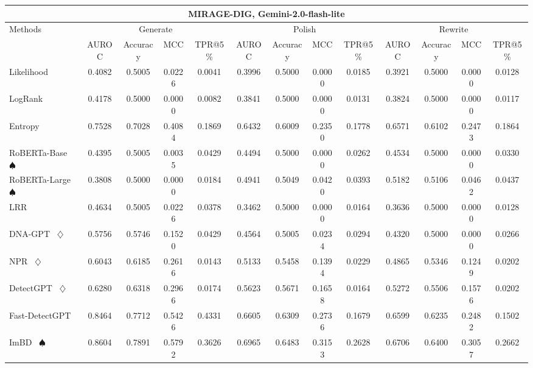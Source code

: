 \begin{table*}[h]
{\begin{tabular}{l|cccc|cccc|cccc}
    \hline

    \hline
    \multicolumn{13}{c}{\textbf{MIRAGE-DIG, Gemini-2.0-flash-lite}}\\
    \hline

    \hline

    \hline
    \multirow{2}{*}{Methods}&\multicolumn{4}{c|}{Generate}&\multicolumn{4}{c|}{Polish}&\multicolumn{4}{c}{Rewrite} \\
    &  AUROC  &  Accuracy  &  MCC  &  TPR@5\%  &  AUROC  &  Accuracy  &  MCC  &  TPR@5\%  &  AUROC  &  Accuracy  &  MCC  &  TPR@5\%  \\
    \hline

    \hline
    Likelihood~\cite{likelihood} & 0.4082 & 0.5005 & 0.0226 & 0.0041 & 0.3996 & 0.5000 & 0.0000 & 0.0185 & 0.3921 & 0.5000 & 0.0000 & 0.0128 \\
    LogRank~\cite{logrank} & 0.4178 & 0.5000 & 0.0000 & 0.0082 & 0.3841 & 0.5000 & 0.0000 & 0.0131 & 0.3824 & 0.5000 & 0.0000 & 0.0117 \\
    Entropy~\cite{entropy} & 0.7528 & 0.7028 & 0.4084 & 0.1869 & 0.6432 & 0.6009 & 0.2350 & 0.1778 & 0.6571 & 0.6102 & 0.2473 & 0.1864 \\
    RoBERTa-Base~\cite{roberta} $\spadesuit$ & 0.4395 & 0.5005 & 0.0035 & 0.0429 & 0.4494 & 0.5000 & 0.0000 & 0.0262 & 0.4534 & 0.5000 & 0.0000 & 0.0330 \\
    RoBERTa-Large~\cite{roberta} $\spadesuit$ & 0.3808 & 0.5000 & 0.0000 & 0.0184 & 0.4941 & 0.5049 & 0.0420 & 0.0393 & 0.5182 & 0.5106 & 0.0462 & 0.0437 \\
    LRR~\cite{lrrandnpr} & 0.4634 & 0.5005 & 0.0226 & 0.0378 & 0.3462 & 0.5000 & 0.0000 & 0.0164 & 0.3636 & 0.5000 & 0.0000 & 0.0128 \\
    DNA-GPT~\cite{dna-gpt} $\diamondsuit$ & 0.5756 & 0.5746 & 0.1520 & 0.0429 & 0.4564 & 0.5005 & 0.0234 & 0.0294 & 0.4320 & 0.5000 & 0.0000 & 0.0266 \\
    NPR~\cite{lrrandnpr} $\diamondsuit$ & 0.6043 & 0.6185 & 0.2616 & 0.0143 & 0.5133 & 0.5458 & 0.1394 & 0.0229 & 0.4865 & 0.5346 & 0.1249 & 0.0202 \\
    DetectGPT~\cite{detectgpt} $\diamondsuit$ & 0.6280 & 0.6318 & 0.2966 & 0.0174 & 0.5623 & 0.5671 & 0.1658 & 0.0164 & 0.5272 & 0.5506 & 0.1576 & 0.0202 \\
    Fast-DetectGPT~\cite{fastdetectgpt} & 0.8464 & 0.7712 & 0.5426 & 0.4331 & 0.6605 & 0.6309 & 0.2736 & 0.1679 & 0.6599 & 0.6235 & 0.2482 & 0.1502 \\
    ImBD~\cite{imbd} $\spadesuit$ & 0.8604 & 0.7891 & 0.5792 & 0.3626 & 0.6965 & 0.6483 & 0.3153 & 0.2628 & 0.6706 & 0.6400 & 0.3057 & 0.2662 \\
    \hline
    

\end{tabular}}
\end{table*}
